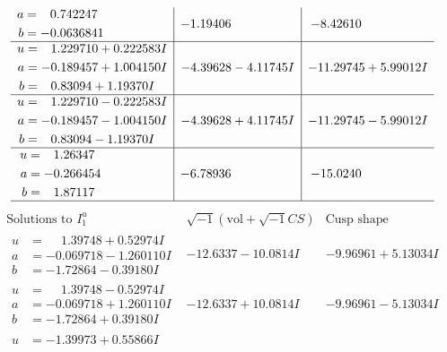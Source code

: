 \documentclass[1p]{elsarticle_modified}
\theoremstyle{definition}
\newcommand{\I}{\sqrt{-1}}
\begin{document}
$$\begin{array}{c|c|c}
\begin{aligned}
a &= \phantom{-}0.742247\phantom{ +0.000000I} \\
b &= -0.0636841\phantom{ +0.000000I}\end{aligned}
 & -1.19406\phantom{ +0.000000I} & -8.42610\phantom{ +0.000000I} \\ \hline\begin{aligned}
u &= \phantom{-}1.229710 + 0.222583 I \\
a &= -0.189457 + 1.004150 I \\
b &= \phantom{-}0.83094 + 1.19370 I\end{aligned}
 & -4.39628 - 4.11745 I & -11.29745 + 5.99012 I \\ \hline\begin{aligned}
u &= \phantom{-}1.229710 - 0.222583 I \\
a &= -0.189457 - 1.004150 I \\
b &= \phantom{-}0.83094 - 1.19370 I\end{aligned}
 & -4.39628 + 4.11745 I & -11.29745 - 5.99012 I \\ \hline\begin{aligned}
u &= \phantom{-}1.26347\phantom{ +0.000000I} \\
a &= -0.266454\phantom{ +0.000000I} \\
b &= \phantom{-}1.87117\phantom{ +0.000000I}\end{aligned}
 & -6.78936\phantom{ +0.000000I} & -15.0240\phantom{ +0.000000I}\\
 \hline 
 \end{array}$$\newpage$$\begin{array}{c|c|c}  
\text{Solutions to }I^u_{1}& \I (\text{vol} + \sqrt{-1}CS) & \text{Cusp shape}\\
 \hline 
\begin{aligned}
u &= \phantom{-}1.39748 + 0.52974 I \\
a &= -0.069718 - 1.260110 I \\
b &= -1.72864 - 0.39180 I\end{aligned}
 & -12.6337 - 10.0814 I & -9.96961 + 5.13034 I \\ \hline\begin{aligned}
u &= \phantom{-}1.39748 - 0.52974 I \\
a &= -0.069718 + 1.260110 I \\
b &= -1.72864 + 0.39180 I\end{aligned}
 & -12.6337 + 10.0814 I & -9.96961 - 5.13034 I \\ \hline\begin{aligned}
u &= -1.39973 + 0.55866 I \\

\end{aligned}
\end{array}$$
\end{document}
